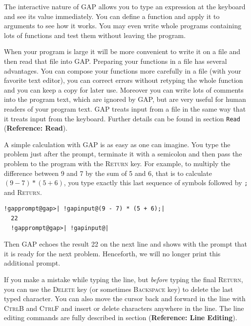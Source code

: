 \documentclass[a4paper,11pt]{report}
\begin{document}
{{ The interactive nature of \textsf{GAP} allows you to type an expression at the keyboard and see its value
immediately. You can define a function and apply it to arguments to see how it
works. You may even write whole programs containing lots of functions and test
them without leaving the program. 

 When your program is large it will be more convenient to write it on a file
and then read that file into \textsf{GAP}. Preparing your functions in a file has several advantages. You can compose
your functions more carefully in a file (with your favorite text editor), you
can correct errors without retyping the whole function and you can keep a copy
for later use. Moreover you can write lots of comments into the program text,
which are ignored by \textsf{GAP}, but are very useful for human readers of your program text. \textsf{GAP} treats input from a file in the same way that it treats input from the
keyboard. Further details can be found in section \texttt{Read} (\textbf{Reference: Read}). 

 A simple calculation with \textsf{GAP} is as easy as one can imagine. You type the problem just after the prompt,
terminate it with a semicolon and then pass the problem to the program with
the \textsc{Return} key. For example, to multiply the difference between 9 and 7 by the sum of 5
and 6, that is to calculate $(9 - 7) * (5 + 6)$, you type exactly this last sequence of symbols followed by \texttt{;} and \textsc{Return}. 

 
\begin{Verbatim}[commandchars=!@|,fontsize=\small,frame=single,label=Example]
  !gapprompt@gap>| !gapinput@(9 - 7) * (5 + 6);|
  22
  !gapprompt@gap>| !gapinput@|
\end{Verbatim}
 

 Then \textsf{GAP} echoes the result 22 on the next line and shows with the prompt that it is
ready for the next problem. Henceforth, we will no longer print this
additional prompt. 

  If you make a mistake while typing the line, but \emph{before} typing the final \textsc{Return}, you can use the \textsc{Delete} key (or sometimes \textsc{Backspace} key) to delete the last typed character. You can also move the cursor back and
forward in the line with \textsc{Ctrl\texttt{}B} and \textsc{Ctrl\texttt{}F} and insert or delete characters anywhere in the line. The line editing
commands are fully described in section{\nobreakspace} (\textbf{Reference: Line Editing}). 

}}
\end{document}
